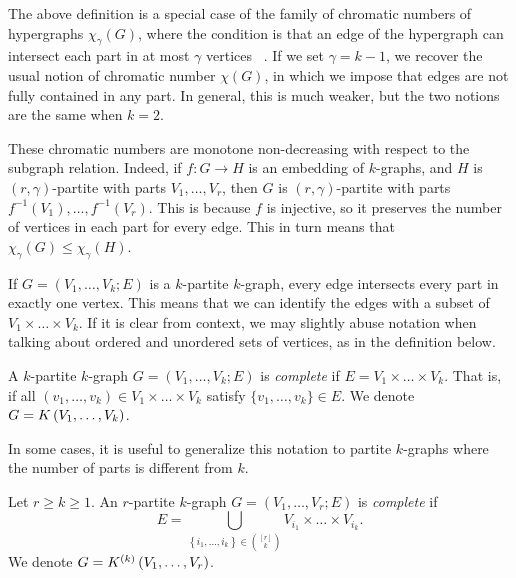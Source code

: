 The above definition is a special case of the family of chromatic numbers of hypergraphs $\chi_{\gamma}(G)$,
where the condition is that an edge of the hypergraph can intersect each part in at most
$\gamma$ vertices ~\cite{krivelevich1998chromatic}.
If we set $\gamma = k - 1$, we recover the usual notion of chromatic number $\chi(G)$,
in which we impose that edges are not fully contained in any part.
In general, this is much weaker, but the two notions are the same when $k = 2$.

\begin{remark}
    These chromatic numbers are monotone non-decreasing with respect to the subgraph relation.
    Indeed, if $f: G \to H$ is an embedding of $k$-graphs,
    and $H$ is $(r, \gamma)$-partite with parts $V_1, \dots, V_r$,
    then $G$ is $(r, \gamma)$-partite with parts $f^{-1}(V_1), \dots, f^{-1}(V_r)$.
    This is because $f$ is injective, so it preserves the number of vertices in each part for every edge.
    This in turn means that $\chi_{\gamma}(G) \leq \chi_{\gamma}(H)$.
\end{remark}

If $G = (V_1, \dots, V_k; E)$ is a $k$-partite $k$-graph,
every edge intersects every part in exactly one vertex.
This means that we can identify the edges with a subset of $ V_1 \times \dots \times V_k$.
If it is clear from context, we may slightly abuse notation when talking about ordered and
unordered sets of vertices, as in the definition below.


\begin{definition} \label{def:complete_kpartite}
    A $k$-partite $k$-graph $G = (V_1, \dots, V_k; E)$ is \emph{complete}
    if $E = V_1 \times \dots \times V_k$.
    That is, if all $(v_1, \dots, v_k) \in V_1 \times \dots \times V_k$
    satisfy $\{v_1, \dots, v_k\} \in E$.
    We denote $G = K\left(V_1, \dots, V_k\right)$.
\end{definition}

In some cases, it is useful to generalize this notation to partite $k$-graphs
where the number of parts is different from $k$.

\begin{definition}
    Let $r \geq k \geq 1$.
    An $r$-partite $k$-graph $G = (V_1, \dots, V_r; E)$ is \emph{complete} if
    \[
        E = \bigcup_{\left\{i_1, \dots, i_k \right\} \in \binom{[r]}{k}} V_{i_1} \times \dots \times V_{i_k}.
    \]
    We denote $G = K^{(k)}\left(V_1, \dots, V_r\right)$.

\end{definition}

